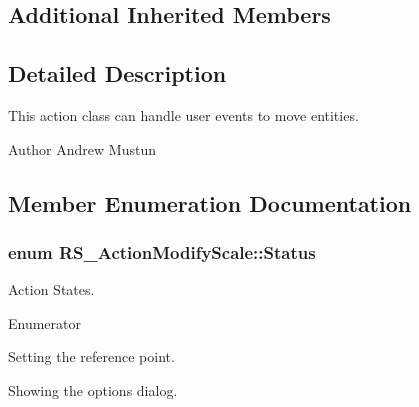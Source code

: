 \subsection*{Additional Inherited Members}


\subsection{Detailed Description}
This action class can handle user events to move entities.

\begin{DoxyAuthor}{Author}
Andrew Mustun 
\end{DoxyAuthor}


\subsection{Member Enumeration Documentation}
\hypertarget{classRS__ActionModifyScale_a8ec0d4f81f0f4d524b7234d3597c4b48}{
\subsubsection[{Status}]{\setlength{\rightskip}{0pt plus 5cm}enum {\bf R\-S\-\_\-\-Action\-Modify\-Scale\-::\-Status}}}\label{classRS__ActionModifyScale_a8ec0d4f81f0f4d524b7234d3597c4b48}
Action States. \begin{Desc}
\item[Enumerator]\par
\begin{description}
\item[{\em 
\hypertarget{classRS__ActionModifyScale_a8ec0d4f81f0f4d524b7234d3597c4b48a19e764e6d6c834924e54d7f741b4c51d}{Set\-Reference\-Point}\label{classRS__ActionModifyScale_a8ec0d4f81f0f4d524b7234d3597c4b48a19e764e6d6c834924e54d7f741b4c51d}
}]Setting the reference point. \item[{\em 
\hypertarget{classRS__ActionModifyScale_a8ec0d4f81f0f4d524b7234d3597c4b48a1b7e756acf074c18b7aa78cd457795e9}{Show\-Dialog}\label{classRS__ActionModifyScale_a8ec0d4f81f0f4d524b7234d3597c4b48a1b7e756acf074c18b7aa78cd457795e9}
}]Showing the options dialog. \end{description}
\end{Desc}


